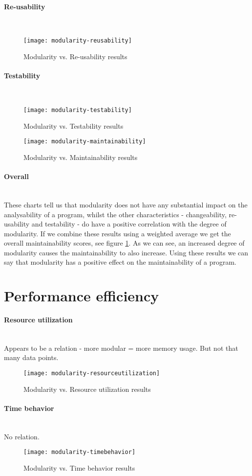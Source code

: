 \documentclass[twoside]{uva-inf-bachelor-thesis}
\newcommand{\myparagraph}[1]{\paragraph{#1}\mbox{}\\}
\begin{document}
\myparagraph{Re-usability}
\begin{figure}[H]
    \caption{Modularity vs. Re-usability results}
    \centering
        \texttt{[image: modularity-reusability]}
\end{figure}

\myparagraph{Testability}
\begin{figure}[H]
    \caption{Modularity vs. Testability results}
    \centering
        \texttt{[image: modularity-testability]}
\end{figure}

\begin{figure}[H]
    \label{figure:mod-main}
    \caption{Modularity vs. Maintainability results}
    \centering
        \texttt{[image: modularity-maintainability]}
\end{figure}

\myparagraph{Overall}
These charts tell us that modularity does not have any substantial impact on the analysability of a program, whilst the other characteristics - changeability, re-usability and testability - do have a positive correlation with the degree of modularity. If we combine these results using a weighted average we get the overall maintainability scores, see figure \ref{figure:mod-main}. As we can see, an increased degree of modularity causes the maintainability to also increase. Using these results we can say that modularity has a positive effect on the maintainability of a program.

\section{Performance efficiency}
\myparagraph{Resource utilization}
Appears to be a relation - more modular = more memory usage. But not that many data points.
\begin{figure}[H]
    \label{figure:perf-res}
    \caption{Modularity vs. Resource utilization results}
    \centering
        \texttt{[image: modularity-resourceutilization]}
\end{figure}

\myparagraph{Time behavior}
No relation.
\begin{figure}[H]
    \label{figure:perf-time}
    \caption{Modularity vs. Time behavior results}
    \centering
        \texttt{[image: modularity-timebehavior]}
\end{figure}
\end{document}
